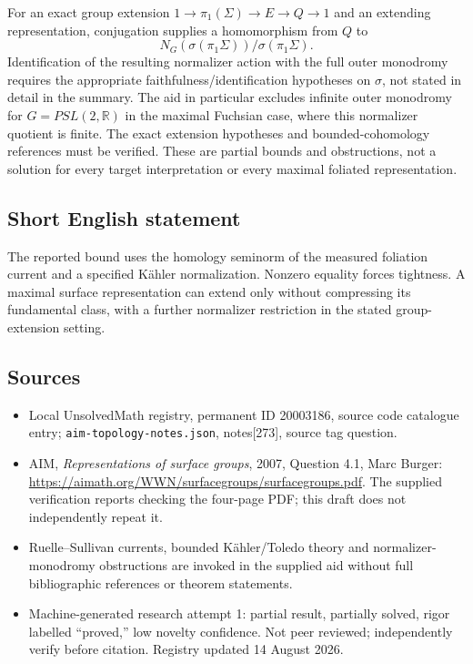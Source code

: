 \documentclass[11pt]{article}
\newcommand{\R}{\mathbb{R}}
\begin{document}
For an exact group extension $1\to\pi_1(\Sigma)\to E\to Q\to1$ and an extending representation, conjugation supplies a homomorphism from $Q$ to
\[
 N_G(\sigma(\pi_1\Sigma))/\sigma(\pi_1\Sigma).
\]
Identification of the resulting normalizer action with the full outer monodromy requires the appropriate faithfulness/identification hypotheses on $\sigma$, not stated in detail in the summary. The aid in particular excludes infinite outer monodromy for $G=PSL(2,\R)$ in the maximal Fuchsian case, where this normalizer quotient is finite. The exact extension hypotheses and bounded-cohomology references must be verified. These are partial bounds and obstructions, not a solution for every target interpretation or every maximal foliated representation.
\subsection{Short English statement}
The reported bound uses the homology seminorm of the measured foliation current and a specified Kähler normalization. Nonzero equality forces tightness. A maximal surface representation can extend only without compressing its fundamental class, with a further normalizer restriction in the stated group-extension setting.
\subsection{Sources}
\begin{itemize}
\item Local UnsolvedMath registry, permanent ID 20003186, source code catalogue entry; \texttt{aim-topology-notes.json}, notes[273], source tag question.
\item AIM, \emph{Representations of surface groups}, 2007, Question 4.1, Marc Burger: \url{https://aimath.org/WWN/surfacegroups/surfacegroups.pdf}. The supplied verification reports checking the four-page PDF; this draft does not independently repeat it.
\item Ruelle--Sullivan currents, bounded K\"ahler/Toledo theory and normalizer-monodromy obstructions are invoked in the supplied aid without full bibliographic references or theorem statements.
\item Machine-generated research attempt 1: partial result, partially solved, rigor labelled ``proved,'' low novelty confidence. Not peer reviewed; independently verify before citation. Registry updated 14 August 2026.
\end{itemize}
\end{document}
